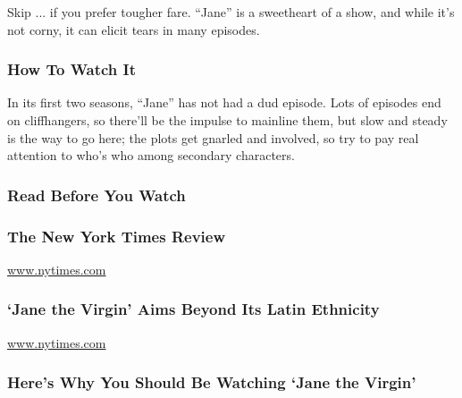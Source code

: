 Skip ... if you prefer tougher fare. ``Jane'' is a sweetheart of a show,
and while it's not corny, it can elicit tears in many episodes.

\hypertarget{how-to-watch-it}{%
\subsubsection{How To Watch It}\label{how-to-watch-it}}

In its first two seasons, ``Jane'' has not had a dud episode. Lots of
episodes end on cliffhangers, so there'll be the impulse to mainline
them, but slow and steady is the way to go here; the plots get gnarled
and involved, so try to pay real attention to who's who among secondary
characters.

\hypertarget{read-before-you-watch}{%
\subsubsection{Read Before You Watch}\label{read-before-you-watch}}

\href{http://www.nytimes.com/2014/10/11/arts/television/jane-the-virgin-on-cw-and-cristela-on-abc.html}{}

\hypertarget{the-new-york-times-review}{%
\subsubsection{The New York Times
Review}\label{the-new-york-times-review}}

\href{http://www.nytimes.com}{www.nytimes.com}

\href{http://www.nytimes.com/2014/09/21/arts/television/jane-the-virgin-aims-beyond-its-latin-ethnicity.html}{}

\hypertarget{jane-the-virgin-aims-beyond-its-latin-ethnicity}{%
\subsubsection{`Jane the Virgin' Aims Beyond Its Latin
Ethnicity}\label{jane-the-virgin-aims-beyond-its-latin-ethnicity}}

\href{http://www.nytimes.com}{www.nytimes.com}

\href{http://www.vulture.com/2014/11/you-should-be-watching-jane-the-virgin.html}{}

\hypertarget{heres-why-you-should-be-watching-jane-the-virgin}{%
\subsubsection{Here's Why You Should Be Watching `Jane the
Virgin'}\label{heres-why-you-should-be-watching-jane-the-virgin}}

